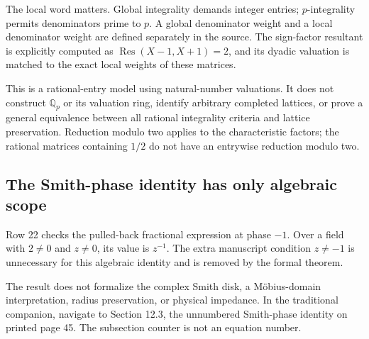 The local word matters. Global integrality demands integer entries; $p$-integrality permits denominators prime to $p$. A global denominator weight and a local denominator weight are defined separately in the source. The sign-factor resultant is explicitly computed as $\operatorname{Res}(X-1,X+1)=2$, and its dyadic valuation is matched to the exact local weights of these matrices.

This is a rational-entry model using natural-number valuations. It does not construct $\mathbb Q_p$ or its valuation ring, identify arbitrary completed lattices, or prove a general equivalence between all rational integrality criteria and lattice preservation. Reduction modulo two applies to the characteristic factors; the rational matrices containing $1/2$ do not have an entrywise reduction modulo two.

\subsection{The Smith-phase identity has only algebraic scope}

Row 22 checks the pulled-back fractional expression  at phase $-1$. Over a field with $2\ne0$ and $z\ne0$, its value is $z^{-1}$. The extra manuscript condition $z\ne-1$ is unnecessary for this algebraic identity and is removed by the formal theorem.

The result does not formalize the complex Smith disk, a M\"obius-domain interpretation, radius preservation, or physical impedance. In the traditional companion, navigate to Section 12.3, the unnumbered Smith-phase identity on printed page 45. The subsection counter is not an equation number.
